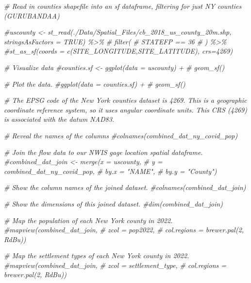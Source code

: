\documentclass[
  12pt,
]{article}
\newenvironment{Shaded}{\begin{snugshade}}{\end{snugshade}}
\newcommand{\CommentTok}[1]{\textcolor[rgb]{0.56,0.35,0.01}{\textit{#1}}}
\begin{document}
\begin{Shaded}
\begin{Highlighting}[]
\CommentTok{\# Read in counties shapefile into an sf dataframe, filtering for just NY counties (GURUBANDAA)}

\CommentTok{\#uscounty \textless{}{-} st\_read(\textquotesingle{}./Data/Spatial\_Files/cb\_2018\_us\_county\_20m.shp\textquotesingle{}, stringsAsFactors = TRUE) \%\textgreater{}\%}
 \CommentTok{\# filter(}
   \CommentTok{\# STATEFP == 36}
   \CommentTok{\# ) \%\textgreater{}\%}
  \CommentTok{\#st\_as\_sf(coords = c(\textquotesingle{}SITE\_LONGITUDE\textquotesingle{},\textquotesingle{}SITE\_LATITUDE\textquotesingle{}), crs=4269)}


\CommentTok{\# Visualize data}
\CommentTok{\#counties.sf \textless{}{-} ggplot(data = uscounty) +}
 \CommentTok{\# geom\_sf()}

\CommentTok{\# Plot the data.}
\CommentTok{\#ggplot(data = counties.sf) +}
 \CommentTok{\# geom\_sf()}

\CommentTok{\# The EPSG code of the New York counties dataset is 4269. This is a geographic coordinate reference system, so it uses angular coordinate units. This CRS (4269) is associated with the datum NAD83.}

\CommentTok{\# Reveal the names of the columns}
\CommentTok{\#colnames(combined\_dat\_ny\_covid\_pop)}

\CommentTok{\# Join the flow data to our NWIS gage location spatial dataframe.}
\CommentTok{\#combined\_dat\_join \textless{}{-} merge(x = uscounty,}
                       \CommentTok{\#   y = combined\_dat\_ny\_covid\_pop,}
                        \CommentTok{\#  by.x = "NAME",}
                         \CommentTok{\# by.y = "County")}

\CommentTok{\# Show the column names of the joined dataset.}
\CommentTok{\#colnames(combined\_dat\_join)}

\CommentTok{\# Show the dimensions of this joined dataset.}
\CommentTok{\#dim(combined\_dat\_join)}

\CommentTok{\# Map the population of each New York county in 2022.}
\CommentTok{\#mapview(combined\_dat\_join, }
       \CommentTok{\# zcol = \textquotesingle{}pop2022\textquotesingle{}, }
       \CommentTok{\# col.regions = brewer.pal(2, \textquotesingle{}RdBu\textquotesingle{}))}

\CommentTok{\# Map the settlement types of each New York county in 2022.}
\CommentTok{\#mapview(combined\_dat\_join, }
      \CommentTok{\#  zcol = \textquotesingle{}settlement\_type\textquotesingle{}, }
       \CommentTok{\# col.regions = brewer.pal(2, \textquotesingle{}RdBu\textquotesingle{}))}


\end{Highlighting}
\end{Shaded}
\end{document}
